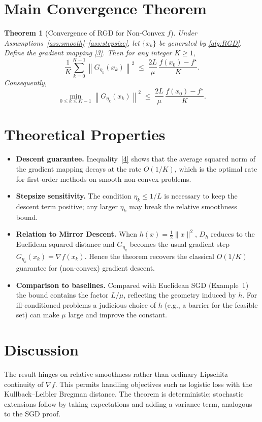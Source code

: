 \documentclass{article}
\newtheorem{theorem}{Theorem}
\newcommand{\grad}{\nabla}
\newcommand{\Breg}{D_{h}}
\newcommand{\norm}[1]{\left\|#1\right\|}
\begin{document}
\section*{Main Convergence Theorem}
\begin{theorem}[Convergence of RGD for Non‑Convex $f$]\label{thm:main}
Under Assumptions~\ref{ass:smooth}–\ref{ass:stepsize}, let $\{x_k\}$ be generated by \eqref{alg:RGD}. Define the gradient mapping \eqref{3}. Then for any integer $K\ge1$,
\[
\frac{1}{K}\sum_{k=0}^{K-1}\norm{G_{\eta_k}(x_k)}^{2}
\;\le\;
\frac{2L}{\mu}\,\frac{f(x_0)-f^\star}{K}.
\tag{4}
\]
Consequently,
\[
\min_{0\le k\le K-1}\norm{G_{\eta_k}(x_k)}^{2}
\;\le\;
\frac{2L}{\mu}\,\frac{f(x_0)-f^\star}{K}.
\]
\end{theorem}

\section*{Theoretical Properties}
\begin{itemize}[leftmargin=*]
\item \textbf{Descent guarantee.} Inequality~\eqref{4} shows that the average squared norm of the gradient mapping decays at the rate $O(1/K)$, which is the optimal rate for first‑order methods on smooth non‑convex problems.
\item \textbf{Stepsize sensitivity.} The condition $\eta_k\le 1/L$ is necessary to keep the descent term positive; any larger $\eta_k$ may break the relative smoothness bound.
\item \textbf{Relation to Mirror Descent.} When $h(x)=\tfrac12\|x\|^{2}$, $\Breg$ reduces to the Euclidean squared distance and $G_{\eta_k}$ becomes the usual gradient step $G_{\eta_k}(x_k)=\grad f(x_k)$. Hence the theorem recovers the classical $O(1/K)$ guarantee for (non‑convex) gradient descent.
\item \textbf{Comparison to baselines.} Compared with Euclidean SGD (Example~1) the bound contains the factor $L/\mu$, reflecting the geometry induced by $h$. For ill‑conditioned problems a judicious choice of $h$ (e.g., a barrier for the feasible set) can make $\mu$ large and improve the constant.
\end{itemize}

\section*{Discussion}
The result hinges on relative smoothness rather than ordinary Lipschitz continuity of $\grad f$. This permits handling objectives such as logistic loss with the Kullback–Leibler Bregman distance. The theorem is deterministic; stochastic extensions follow by taking expectations and adding a variance term, analogous to the SGD proof.
\end{document}
